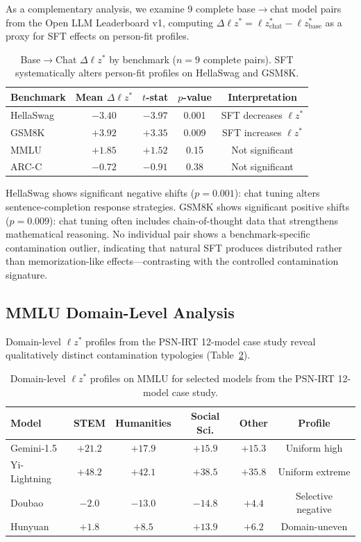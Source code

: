 \documentclass[11pt,a4paper]{article}
\begin{document}
As a complementary analysis, we examine 9 complete base$\to$chat model pairs from the Open LLM Leaderboard v1, computing $\Delta \ell z^* = \ell z^*_{\text{chat}} - \ell z^*_{\text{base}}$ as a proxy for SFT effects on person-fit profiles.

\begin{table}[h]
\centering
\caption{Base$\to$Chat $\Delta \ell z^*$ by benchmark ($n = 9$ complete pairs). SFT systematically alters person-fit profiles on HellaSwag and GSM8K.}
\label{tab:base-chat}
\begin{tabular}{lcccc}
\toprule
\textbf{Benchmark} & \textbf{Mean $\Delta \ell z^*$} & \textbf{$t$-stat} & \textbf{$p$-value} & \textbf{Interpretation} \\
\midrule
HellaSwag & $-3.40$ & $-3.97$ & 0.001 & SFT decreases $\ell z^*$ \\
GSM8K     & $+3.92$ & $+3.35$ & 0.009 & SFT increases $\ell z^*$ \\
MMLU      & $+1.85$ & $+1.52$ & 0.15  & Not significant \\
ARC-C     & $-0.72$ & $-0.91$ & 0.38  & Not significant \\
\bottomrule
\end{tabular}
\end{table}

HellaSwag shows significant negative shifts ($p = 0.001$): chat tuning alters sentence-completion response strategies.
GSM8K shows significant positive shifts ($p = 0.009$): chat tuning often includes chain-of-thought data that strengthens mathematical reasoning.
No individual pair shows a benchmark-specific contamination outlier, indicating that natural SFT produces distributed rather than memorization-like effects---contrasting with the controlled contamination signature.

\subsection{MMLU Domain-Level Analysis}
\label{sec:case-study}

Domain-level $\ell z^*$ profiles from the PSN-IRT 12-model case study reveal qualitatively distinct contamination typologies (Table~\ref{tab:domain-profiles}).

\begin{table}[h]
\centering
\caption{Domain-level $\ell z^*$ profiles on MMLU for selected models from the PSN-IRT 12-model case study.}
\label{tab:domain-profiles}
\begin{tabular}{lccccc}
\toprule
\textbf{Model} & \textbf{STEM} & \textbf{Humanities} & \textbf{Social Sci.} & \textbf{Other} & \textbf{Profile} \\
\midrule
Gemini-1.5    & $+21.2$ & $+17.9$ & $+15.9$ & $+15.3$ & Uniform high \\
Yi-Lightning  & $+48.2$ & $+42.1$ & $+38.5$ & $+35.8$ & Uniform extreme \\
Doubao        & $-2.0$  & $-13.0$ & $-14.8$ & $+4.4$  & Selective negative \\
Hunyuan       & $+1.8$  & $+8.5$  & $+13.9$ & $+6.2$  & Domain-uneven \\
\bottomrule
\end{tabular}
\end{table}
\end{document}
